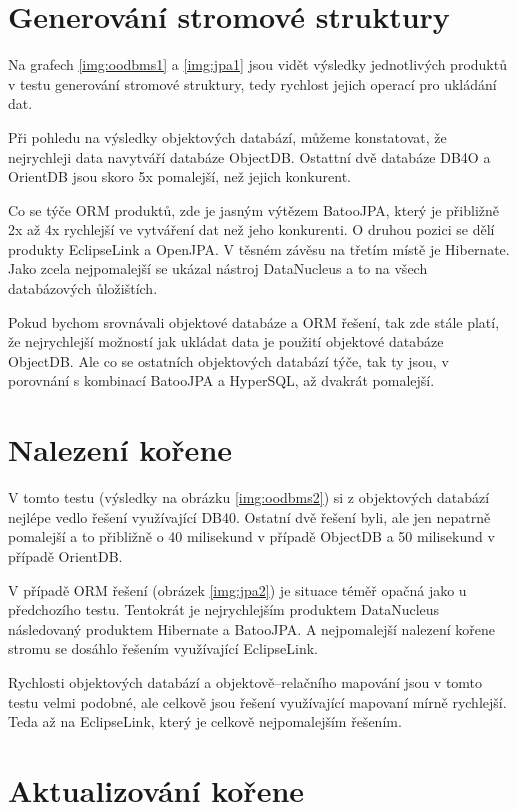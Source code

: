 \section{Generování stromové struktury}
Na grafech \ref{img:oodbms1} a \ref{img:jpa1} jsou vidět výsledky jednotlivých produktů v testu generování stromové struktury, tedy rychlost jejich operací pro ukládání dat.

Při pohledu na výsledky objektových databází, můžeme konstatovat, že nejrychleji data navytváří databáze ObjectDB. Ostattní dvě databáze DB4O a OrientDB jsou skoro 5x pomalejší, než jejich konkurent.

Co se týče ORM produktů, zde je jasným výtězem BatooJPA, který je přibližně 2x až 4x rychlejší ve vytváření dat než jeho konkurenti. O druhou pozici se dělí produkty EclipseLink a OpenJPA. V těsném závěsu na třetím místě je Hibernate. Jako zcela nejpomalejší se ukázal nástroj DataNucleus a to na všech databázových ůložištích.

Pokud bychom srovnávali objektové databáze a ORM řešení, tak zde stále platí, že nejrychlejší možností jak ukládat data je použití objektové databáze ObjectDB. Ale co se ostatních objektových databází týče, tak ty jsou, v porovnání s kombinací BatooJPA a HyperSQL, až dvakrát pomalejší.
\section{Nalezení kořene}
V tomto testu (výsledky na obrázku \ref{img:oodbms2}) si z objektových databází nejlépe vedlo řešení využívající DB40. Ostatní dvě řešení byli, ale jen nepatrně pomalejší a to přibližně o 40 milisekund v případě ObjectDB a 50 milisekund v případě OrientDB.

V případě ORM řešení (obrázek \ref{img:jpa2}) je situace téměř opačná jako u předchozího testu. Tentokrát je nejrychlejším produktem DataNucleus následovaný produktem Hibernate a BatooJPA. A nejpomalejší nalezení kořene stromu se dosáhlo řešením využívající EclipseLink.

Rychlosti objektových databází a objektově--relačního mapování jsou v tomto testu velmi podobné, ale celkově jsou řešení využívající mapovaní mírně rychlejší. Teda až na EclipseLink, který je celkově nejpomalejším řešením.  

\section{Aktualizování kořene}

